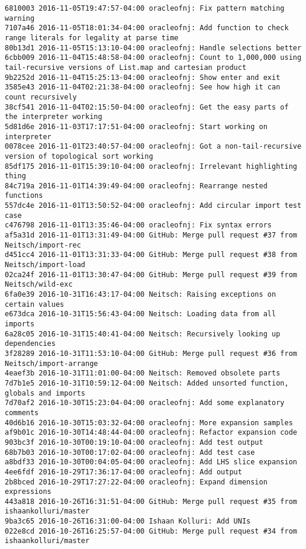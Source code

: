 \begin{lstlisting}
6810003 2016-11-05T19:47:57-04:00 oracleofnj: Fix pattern matching warning
7107a46 2016-11-05T18:01:34-04:00 oracleofnj: Add function to check range literals for legality at parse time
80b13d1 2016-11-05T15:13:10-04:00 oracleofnj: Handle selections better
6cbb009 2016-11-04T15:48:58-04:00 oracleofnj: Count to 1,000,000 using tail-recursive versions of List.map and cartesian product
9b2252d 2016-11-04T15:25:13-04:00 oracleofnj: Show enter and exit
3585e43 2016-11-04T02:21:38-04:00 oracleofnj: See how high it can count recursively
38cf541 2016-11-04T02:15:50-04:00 oracleofnj: Get the easy parts of the interpreter working
5d81d6e 2016-11-03T17:17:51-04:00 oracleofnj: Start working on interpreter
0078cee 2016-11-01T23:40:57-04:00 oracleofnj: Got a non-tail-recursive version of topological sort working
85df175 2016-11-01T15:39:10-04:00 oracleofnj: Irrelevant highlighting thing
84c719a 2016-11-01T14:39:49-04:00 oracleofnj: Rearrange nested functions
557dc4e 2016-11-01T13:50:52-04:00 oracleofnj: Add circular import test case
c476798 2016-11-01T13:35:46-04:00 oracleofnj: Fix syntax errors
af5a31d 2016-11-01T13:31:49-04:00 GitHub: Merge pull request #37 from Neitsch/import-rec
d451cc4 2016-11-01T13:31:33-04:00 GitHub: Merge pull request #38 from Neitsch/import-load
02ca24f 2016-11-01T13:30:47-04:00 GitHub: Merge pull request #39 from Neitsch/wild-exc
6fa0e39 2016-10-31T16:43:17-04:00 Neitsch: Raising exceptions on certain values
e673dca 2016-10-31T15:56:43-04:00 Neitsch: Loading data from all imports
6a28c05 2016-10-31T15:40:41-04:00 Neitsch: Recursively looking up dependencies
3f28289 2016-10-31T11:53:10-04:00 GitHub: Merge pull request #36 from Neitsch/import-arrange
4eaef3b 2016-10-31T11:01:00-04:00 Neitsch: Removed obsolete parts
7d7b1e5 2016-10-31T10:59:12-04:00 Neitsch: Added unsorted function, globals and imports
7d70af2 2016-10-30T15:23:04-04:00 oracleofnj: Add some explanatory comments
40d6b16 2016-10-30T15:03:32-04:00 oracleofnj: More expansion samples
af9b01c 2016-10-30T14:48:44-04:00 oracleofnj: Refactor expansion code
903bc3f 2016-10-30T00:19:10-04:00 oracleofnj: Add test output
68b7b03 2016-10-30T00:17:02-04:00 oracleofnj: Add test case
a8bdf33 2016-10-30T00:04:05-04:00 oracleofnj: Add LHS slice expansion
4ee6fdf 2016-10-29T17:36:17-04:00 oracleofnj: Add output
2b8bced 2016-10-29T17:27:22-04:00 oracleofnj: Expand dimension expressions
443a818 2016-10-26T16:31:51-04:00 GitHub: Merge pull request #35 from ishaankolluri/master
9ba3c65 2016-10-26T16:31:00-04:00 Ishaan Kolluri: Add UNIs
022e8cd 2016-10-26T16:25:57-04:00 GitHub: Merge pull request #34 from ishaankolluri/master

\end{lstlisting}
